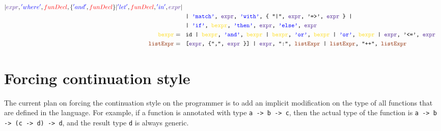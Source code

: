 \documentclass{article}
\begin{document}
\begin{align*}
{	| \color{RoyalPurple}expr\color{black}, \color{blue}'where'\color{black}, \color{red} funDecl\color{black}, \{ \color{blue}'and'\color{black}, \color{red}funDecl \color{black} \} 
	| \color{blue}'let'\color{black}, \color{red}funDecl\color{black}, \color{blue}'in'\color{black}, \color{RoyalPurple}expr \color{black} 
|}\\
&\texttt{
	| \color{blue}'match'\color{black}, \color{RoyalPurple}expr\color{black}, \color{blue}'with'\color{black}, \{ "|", \color{RoyalPurple}expr\color{black}, '=>', \color{RoyalPurple}expr \color{black} \}
|}\\
&\texttt{
	| \color{blue}'if'\color{black}, \color{Goldenrod}bexpr\color{black}, \color{blue}'then'\color{black}, \color{RoyalPurple}expr\color{black}, \color{blue}'else'\color{black}, \color{RoyalPurple}expr\color{black}
}\\
\texttt{\color{Goldenrod}bexpr\color{black}} =\ &\texttt{
	id
	| \color{Goldenrod}bexpr\color{black}, \color{blue}'and'\color{black}, \color{Goldenrod}bexpr \color{black}
	| \color{Goldenrod}bexpr\color{black}, \color{blue} 'or'\color{black}, \color{Goldenrod}bexpr \color{black}
	| \color{blue} 'or'\color{black}, \color{Goldenrod}bexpr \color{black} 
	| \color{RoyalPurple}expr\color{black}, '<=', \color{RoyalPurple}expr\color{black}
}\\
\texttt{\color{RawSienna}listExpr\color{black}} =\ &\texttt{
	[\color{RoyalPurple}expr\color{black}, \{",", \color{RoyalPurple}expr \color{black}\}]
	| \color{RoyalPurple} expr\color{black}, ":", \color{RawSienna}listExpr \color{black}
	| \color{RawSienna}listExpr\color{black}, "++", \color{RawSienna}listExpr \color{black}
}
\end{align*}
\section{Forcing continuation style}
The current plan on forcing the continuation style on the programmer is to add an implicit modification on the type of all functions that are defined in the language. For example, if a function is annotated with type \texttt{a -> b -> c}, then the actual type of the function is \texttt{a -> b -> (c -> d) -> d}, and the result type \texttt{d} is always generic.
\end{document}
